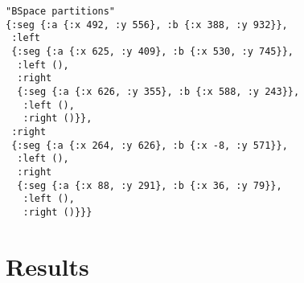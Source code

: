 \documentclass[12pt,a4paper]{article}
\begin{document}

\begin{verbatim}
"BSpace partitions"
{:seg {:a {:x 492, :y 556}, :b {:x 388, :y 932}},
 :left
 {:seg {:a {:x 625, :y 409}, :b {:x 530, :y 745}},
  :left (),
  :right
  {:seg {:a {:x 626, :y 355}, :b {:x 588, :y 243}},
   :left (),
   :right ()}},
 :right
 {:seg {:a {:x 264, :y 626}, :b {:x -8, :y 571}},
  :left (),
  :right
  {:seg {:a {:x 88, :y 291}, :b {:x 36, :y 79}},
   :left (),
   :right ()}}}
\end{verbatim}


\section{Results}


\end{document}
